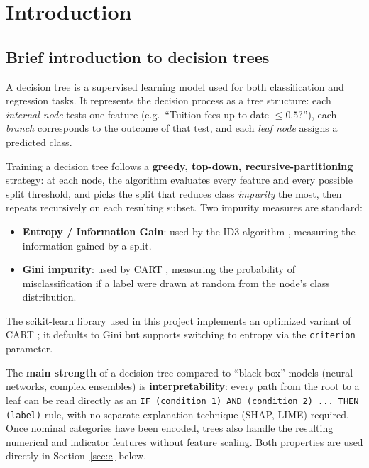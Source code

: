 
\section{Introduction}
\label{sec:b}

\subsection{Brief introduction to decision trees}

A decision tree is a supervised learning model used for both classification
and regression tasks. It represents the decision process as a tree
structure: each \emph{internal node} tests one feature (e.g.\ ``Tuition
fees up to date $\le 0.5$?''), each \emph{branch} corresponds to the
outcome of that test, and each \emph{leaf node} assigns a predicted class.

Training a decision tree follows a \textbf{greedy, top-down,
recursive-partitioning} strategy: at each node, the algorithm evaluates
every feature and every possible split threshold, and picks the split that
reduces class \emph{impurity} the most, then repeats recursively on each
resulting subset. Two impurity measures are standard:

\begin{itemize}
  \item \textbf{Entropy / Information Gain}: used by the ID3 algorithm
    \citep{quinlan1986induction}, measuring the information gained by a
    split.
  \item \textbf{Gini impurity}: used by CART \citep{breiman1984classification},
    measuring the probability of misclassification if a label were drawn
    at random from the node's class distribution.
\end{itemize}

The scikit-learn library used in this project implements an optimized
variant of CART \citep{pedregosa2011scikit}; it defaults to Gini but
supports switching to entropy via the \texttt{criterion} parameter.

The \textbf{main strength} of a decision tree compared to ``black-box''
models (neural networks, complex ensembles) is \textbf{interpretability}:
every path from the root to a leaf can be read directly as an
\texttt{IF (condition 1) AND (condition 2) ... THEN (label)} rule, with no
separate explanation technique (SHAP, LIME) required. Once nominal
categories have been encoded, trees also handle the resulting numerical
and indicator features without feature scaling. Both properties are used
directly in Section~\ref{sec:c} below.

